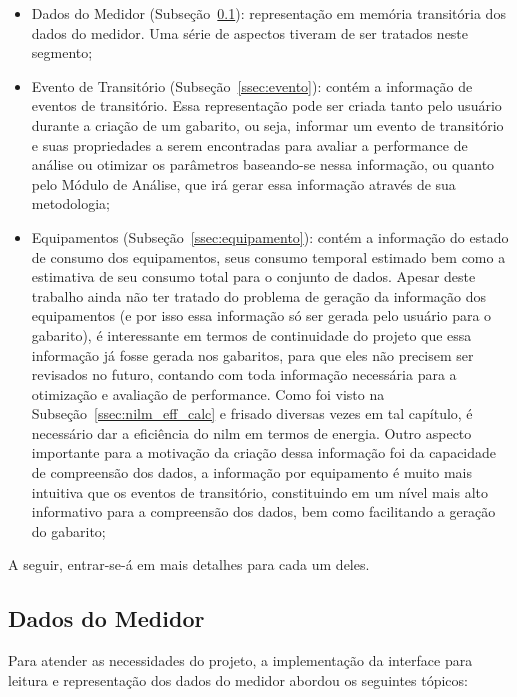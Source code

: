 \begin{itemize}
\item Dados do Medidor (Subseção~\ref{ssec:dados_medidor}):
representação em memória transitória dos dados do medidor. Uma série
de aspectos tiveram de ser tratados neste segmento;
\item Evento de Transitório (Subseção~\ref{ssec:evento}): contém a informação de
eventos de transitório. Essa representação pode ser criada tanto pelo
usuário durante a criação de um gabarito, ou seja, informar um evento
de transitório e suas propriedades a serem encontradas para avaliar a
performance de análise ou otimizar os parâmetros baseando-se nessa
informação, ou quanto pelo Módulo de Análise, que irá gerar essa
informação através de sua metodologia;
\item Equipamentos (Subseção~\ref{ssec:equipamento}): contém a informação
do estado de consumo dos equipamentos, seus consumo temporal estimado bem
como a estimativa de seu consumo total para o conjunto de dados.
Apesar deste trabalho ainda não ter tratado do problema de geração da
informação dos equipamentos (e por isso essa informação só ser gerada
pelo usuário para o gabarito), é interessante em termos de
continuidade do projeto que essa informação já fosse gerada nos
gabaritos, para que eles não precisem ser revisados no futuro,
contando com toda informação necessária para a otimização e avaliação
de performance. Como foi visto na Subseção~\ref{ssec:nilm_eff_calc} e
frisado diversas vezes em tal capítulo, é necessário dar a eficiência
do \gls{nilm} em termos de energia. Outro aspecto importante para a
motivação da criação dessa informação foi da capacidade de compreensão
dos dados, a informação por equipamento é muito mais intuitiva que os
eventos de transitório, constituindo em um nível mais alto informativo
para a compreensão dos dados, bem como facilitando a geração do
gabarito;
\end{itemize}

A seguir, entrar-se-á em mais detalhes para cada um deles.

\subsection{Dados do Medidor}
\label{ssec:dados_medidor}

Para atender as necessidades do projeto, a implementação da interface
para leitura e representação dos dados do medidor abordou os seguintes
tópicos:

